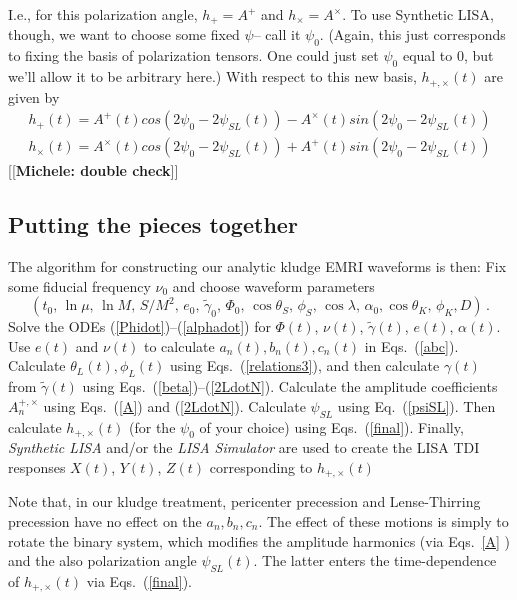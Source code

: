 \documentclass[11pt]{report}
\def\be{\begin{equation}}
\def\ee{\end{equation}}
\begin{document}
I.e., for this polarization angle, $h_+ = A^+$  and  $h_{\times} = 
A^{\times}$.
To use Synthetic LISA, though, we want to choose some fixed $\psi$-- call it $\psi_0$. 
(Again, this just  corresponds to fixing the basis of polarization tensors.  One could just 
set $\psi_0$ equal to $0$, but we'll allow it to be arbitrary here.) With respect to this new
basis, $h_{+,\times}(t)$ are given by
\begin{eqnarray}\label{final}
h_+(t) = A^+(t) cos(2\psi_0 - 2\psi_{SL}(t) ) - A^{\times}(t) sin(2\psi_0 - 2\psi_{SL}(t) ) \nonumber \\
h_{\times}(t) = A^{\times}(t) cos(2\psi_0 - 2\psi_{SL}(t) ) + A^+(t) sin(2\psi_0 - 2\psi_{SL}(t) )
\end{eqnarray}
[[{\bf Michele:  double check}]] 

\subsection{Putting the pieces together}

The algorithm for constructing our analytic kludge EMRI waveforms is then:
Fix some fiducial frequency $\nu_0$ and choose waveform parameters
\be
(t_0,\,\ln\mu,\,\ln M,\,S/M^2,\,e_0,\,\tilde\gamma_0,\,\Phi_0,\,\cos\theta_S,\,
\phi_S,\,\cos\lambda,\,\alpha_0,\cos\theta_K,\,\phi_K,D) \, .
\ee
Solve the ODEs (\ref{Phidot})--(\ref{alphadot})
for $\Phi(t)$, $\nu(t)$, $\tilde\gamma(t)$, $e(t)$, $\alpha(t)$.
Use $e(t)$ and $\nu(t)$ to
calculate $a_n(t), b_n(t), c_n(t)$ in Eqs.~(\ref{abc}).
Calculate $\theta_L(t),\phi_L(t)$ using Eqs.~(\ref{relations3}), and then
calculate $\gamma(t)$ from $\tilde\gamma(t)$ using Eqs.~(\ref{beta})--(\ref{2LdotN}).
Calculate the amplitude coefficients $A_n^{+,\times}$  using Eqs.~(\ref{A}) and (\ref{2LdotN}).
Calculate $\psi_{SL}$ using Eq.~(\ref{psiSL}).
Then calculate $h_{+,\times}(t)$ (for the $\psi_0$ of your choice) using
Eqs.~(\ref{final}).   Finally, {\it Synthetic LISA} and/or the {\it LISA Simulator} are 
used to create the LISA TDI responses $X(t)$, $Y(t)$, $Z(t)$  corresponding to $h_{+,\times}(t)$ 

Note that, in our kludge treatment, pericenter precession and Lense-Thirring
precession have no effect on the $a_n, b_n, c_n$.  The effect of these motions is simply to
rotate the binary system, which modifies the amplitude harmonics (via Eqs.~\ref{A} ) and the 
also polarization angle $\psi_{SL}(t)$. The latter enters the time-dependence of
$h_{+,\times}(t)$ via Eqs.~(\ref{final}). 
\end{document}
